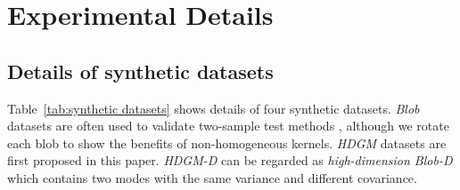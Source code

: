 \documentclass{article}
\begin{document}
\section{Experimental Details}\label{Asec:exp_set}

\subsection{Details of synthetic datasets}\label{Asec:syn_intro}

Table~\ref{tab:synthetic datasets} shows details of four synthetic datasets. \emph{Blob} datasets are often used to validate two-sample test methods \citep{Gretton2012NeurIPS,Jitkrittum2016,sutherland:mmd-opt}, although we rotate each blob to show the benefits of non-homogeneous kernels. \emph{HDGM} datasets are first proposed in this paper. \emph{HDGM-D} can be regarded as \emph{high-dimension Blob-D} which contains two modes with the same variance and different covariance.
\end{document}
